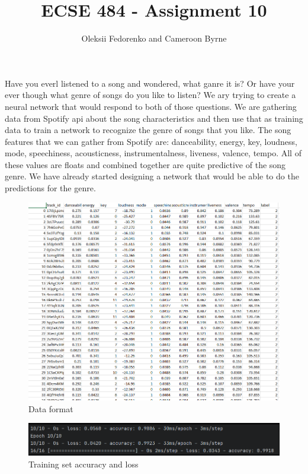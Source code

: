 \documentclass[12pt, oneside, a4paper]{article}
\begin{document}
 
    \title{\textbf{ECSE 484 - Assignment 10}}
    \author{Oleksii Fedorenko and Cameroon Byrne}
    \maketitle
    
    Have you everl listened to a song and wondered, what ganre it is? Or have your ever though what genre of songs do you like to listen? We ary trying to create a neural network that would respond to both of those questions. We are gathering data from Spotify api about the song characteristics and then use that as training data to train a network to recognize the genre of songs that you like. The song features that we can gather from Spotify are: danceability, energy, key, loudness, mode, speechiness, acousticness, instrumentalness, liveness, valence, tempo. All of these values are floats and combined together are quite predictive of the song genre. We have already started designing a network that would be able to do the predictions for the genre. 
    
    \FloatBarrier 
    \begin{figure}[H]
        \caption{Data format} 
        \centerline{
        \includegraphics[width=\textwidth]{data.PNG}
        } 
    \end{figure}

    \FloatBarrier 
    \begin{figure}[H]
        \caption{Training set accuracy and loss} 
        \centerline{
        \includegraphics[width=\textwidth]{tarining_set_loss_acc.PNG}
        } 
    \end{figure}
    
\end{document}
